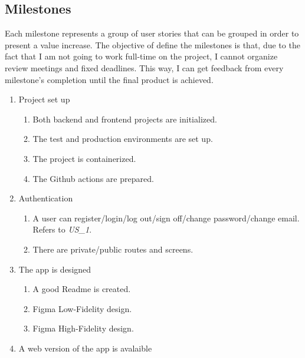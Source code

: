 \subsection{Milestones}
Each milestone represents a group of user stories that can be grouped in order to present a value increase. The objective of define the milestones is that, due to the fact that I am not going to work full-time on the project, I cannot organize review meetings and fixed deadlines. This way, I can get feedback from every milestone's completion until the final product is achieved. \\

\begin{enumerate}[label=\textbf{MIL\_\arabic*}, align=left, leftmargin=*]
    \item Project set up
        \begin{enumerate}[label=\textbf{\theenumi.\arabic*}, align=left, leftmargin=*]
            \item Both backend and frontend projects are initialized.
            \item The test and production environments are set up.
            \item The project is containerized.
            \item The Github actions are prepared.
        \end{enumerate}
    \item Authentication
        \begin{enumerate}[label=\textbf{\theenumi.\arabic*}, align=left, leftmargin=*]
            \item A user can register/login/log out/sign off/change password/change email. Refers to \textit{US\_1}.
            \item There are private/public routes and screens.
        \end{enumerate}
    \item The app is designed
        \begin{enumerate}[label=\textbf{\theenumi.\arabic*}, align=left, leftmargin=*]
            \item A good Readme is created.
            \item Figma \cite{Figma} Low-Fidelity design.
            \item Figma \cite{Figma} High-Fidelity design.
        \end{enumerate}
    \item A web version of the app is avalaible
        \begin{enumerate}[label=\textbf{\theenumi.\arabic*}, align=left, leftmargin=*]

\end{enumerate}
\end{enumerate}
